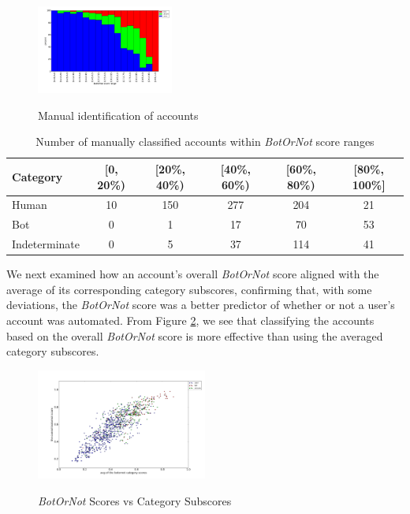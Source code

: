 \documentclass{sig-alternate-05-2015}
\begin{document}
\begin{figure}[h!]
	\caption{Manual identification of accounts}
	\centering
		\includegraphics[width=0.4\textwidth]{imgs/scoreperc}
	\label{fig:scorescat}
	
\end{figure}

\begin{table}
\centering
\begin{tabular}{l*{5}{c}}
Category          & [0, 20\%) & [20\%, 40\%) & [40\%, 60\%) & [60\%, 80\%) & [80\%, 100\%] \\
\hline
Human									& 10 & 150 & 277 & 204 & 21 \\
Bot            				& 0  & 1   & 17  & 70  & 53  \\
Indeterminate         & 0  & 5   & 37  & 114 & 41  \\
\end{tabular}
\caption{Number of manually classified accounts within \emph{BotOrNot} score ranges}
\end{table}

We next examined how an account's overall \emph{BotOrNot} score aligned with the average of its corresponding category subscores, confirming that, with some deviations, the \emph{BotOrNot} score was a better predictor of whether or not a user's account was automated. From Figure \ref{fig:scoresubscore}, we see that classifying the accounts based on the overall \emph{BotOrNot} score is more effective than using the averaged category subscores.

\begin{figure}[h!]
	\caption{\emph{BotOrNot} Scores vs Category Subscores}
	\centering
		\includegraphics[width=0.5\textwidth]{imgs/svacs}
	\label{fig:scoresubscore}
\end{figure}
\end{document}
